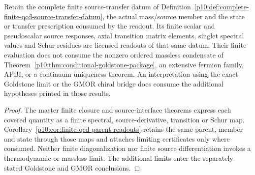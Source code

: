 \documentclass[12pt,a4paper]{article}
\begin{document}
\begin{corollary}
\label{p10:cor:v2186-finite-massive-before-ssb}
Retain the complete finite source-transfer datum of
Definition~\ref{p10:def:complete-finite-qcd-source-transfer-datum}, the actual
mass/source member and the state or transfer prescription consumed by the
readout.  Its finite scalar and pseudoscalar source responses, axial transition
matrix elements, singlet spectral values and Schur residues are licensed
readouts of that same datum.  Their finite evaluation does not consume the
nonzero ordered massless condensate of
Theorem~\ref{p10:thm:conditional-goldstone-package}, an extensive fermion
family, APBI, or a continuum uniqueness theorem.
An interpretation using the exact Goldstone limit or the GMOR chiral bridge
does consume the additional hypotheses printed in those results.
\end{corollary}
\begin{proof}
The master finite closure and source-interface theorems express each covered
quantity as a finite spectral, source-derivative, transition or Schur map.
Corollary~\ref{p10:cor:finite-qcd-parent-readouts} retains the same parent,
member and state through those maps and attaches limiting certificates only
where consumed.  Neither finite diagonalization nor finite source
differentiation invokes a thermodynamic or massless limit.  The additional
limits enter the separately stated Goldstone and GMOR conclusions.
\end{proof}
\end{document}
